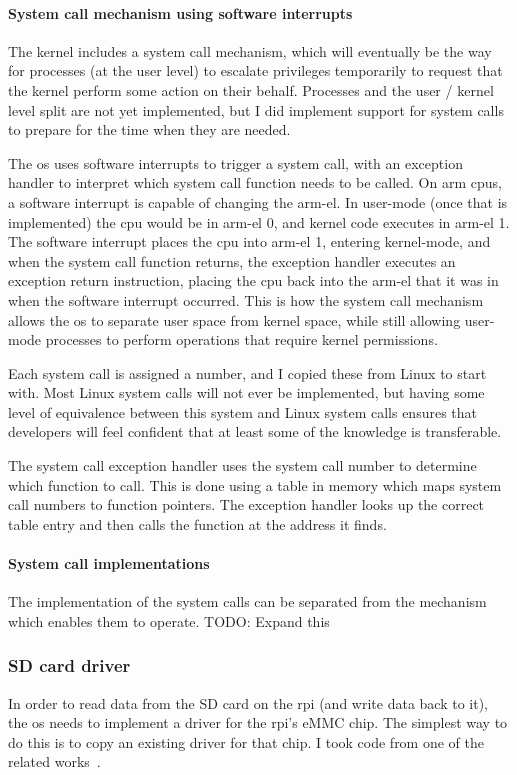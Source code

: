 \documentclass{article}
\begin{document}
\paragraph{System call mechanism using software interrupts}
The kernel includes a system call mechanism, which will eventually be the way
for processes (at the user level) to escalate privileges temporarily to request
that the kernel perform some action on their behalf. Processes and the user /
kernel level split are not yet implemented, but I did implement support for
system calls to prepare for the time when they are needed.

The \gls{os} uses software interrupts to trigger a system call, with an
exception handler to interpret which system call function needs to be called.
On \gls{arm} \glspl{cpu}, a software interrupt is capable of changing the
\gls{arm-el}. In user-mode (once that is implemented) the \gls{cpu} would be in
\gls{arm-el} 0, and kernel code executes in \gls{arm-el} 1. The software
interrupt places the \gls{cpu} into \gls{arm-el} 1, entering kernel-mode, and
when the system call function returns, the exception handler executes an
exception return instruction, placing the \gls{cpu} back into the \gls{arm-el}
that it was in when the software interrupt occurred. This is how the system
call mechanism allows the \gls{os} to separate user space from kernel space,
while still allowing user-mode processes to perform operations that require
kernel permissions.

Each system call is assigned a number, and I copied these from Linux to start
with. Most Linux system calls will not ever be implemented, but having some
level of equivalence between this system and Linux system calls ensures that
developers will feel confident that at least some of the knowledge is
transferable.

The system call exception handler uses the system call number to determine
which function to call. This is done using a table in memory which maps system
call numbers to function pointers. The exception handler looks up the correct
table entry and then calls the function at the address it finds.

\paragraph{System call implementations}
The implementation of the system calls can be separated from the mechanism
which enables them to operate.
TODO: Expand this

\subsubsection{SD card driver}
In order to read data from the SD card on the \gls{rpi} (and write data back to
it), the \gls{os} needs to implement a driver for the \gls{rpi}'s eMMC chip.
The simplest way to do this is to copy an existing driver for that chip. I took
code from one of the related works~\cite{rpi-boot-gh}.
\end{document}

